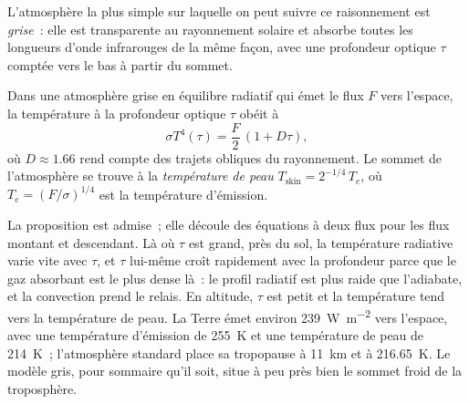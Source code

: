 L'atmosphère la plus simple sur laquelle on peut suivre ce raisonnement est \emph{grise}~: elle
est transparente au rayonnement solaire et absorbe toutes les longueurs d'onde infrarouges de la même façon,
avec une profondeur optique $\tau$ comptée vers le bas à partir du sommet.

\begin{proposition}\label{prop:b3:planetary-atmospheres:grey}
Dans une atmosphère grise en équilibre radiatif qui émet le flux $F$ vers
l'espace, la température à la profondeur optique $\tau$ obéit à
\[
\sigma T^4(\tau) = \frac F2\,(1 + D\tau),
\]
où $D \approx 1.66$ rend compte des trajets obliques du rayonnement.
Le sommet de l'atmosphère se trouve à la \emph{température de peau}
$T_\mathrm{skin} = 2^{-1/4}\,T_e$, où $T_e = (F/\sigma)^{1/4}$ est la
température d'émission.
\end{proposition}

La proposition est admise~; elle découle des équations à deux flux pour les
flux montant et descendant. Là où $\tau$ est grand, près du sol, la
température radiative varie vite avec $\tau$, et $\tau$ lui-même croît
rapidement avec la profondeur parce que le gaz absorbant est le plus dense
là~: le profil radiatif est plus raide que l'adiabate, et la convection prend
le relais. En altitude, $\tau$ est petit et la température tend vers la
température de peau. La Terre émet environ \qty{239}{W.m^{-2}} vers l'espace,
avec une température d'émission de \qty{255}{K} et une température de peau de
\qty{214}{K}~; l'atmosphère standard place sa tropopause à \qty{11}{km}
et à \qty{216.65}{K}. Le modèle gris, pour sommaire qu'il soit, situe à peu près
bien le sommet froid de la troposphère.


